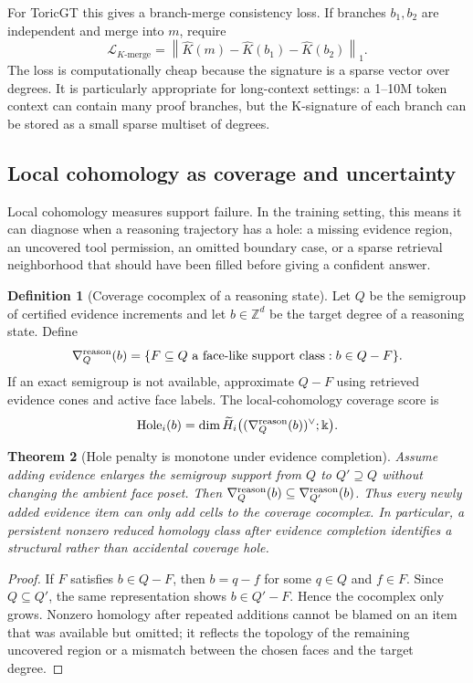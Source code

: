 \documentclass[11pt]{article}
\newtheorem{theorem}{Theorem}[section]
\theoremstyle{definition}
\newtheorem{definition}[theorem]{Definition}
\newcommand{\ZZ}{\mathbb{Z}}
\begin{document}
For ToricGT this gives a branch-merge consistency loss.  If branches \(b_1,b_2\) are independent and merge into \(m\), require
\[
  \mathcal L_{K\text{-merge}}=\left\|\widehat K(m)-\widehat K(b_1)-\widehat K(b_2)\right\|_1.
\]
The loss is computationally cheap because the signature is a sparse vector over degrees.  It is particularly appropriate for long-context settings: a 1--10M token context can contain many proof branches, but the K-signature of each branch can be stored as a small sparse multiset of degrees.

\subsection{Local cohomology as coverage and uncertainty}
Local cohomology measures support failure.  In the training setting, this means it can diagnose when a reasoning trajectory has a hole: a missing evidence region, an uncovered tool permission, an omitted boundary case, or a sparse retrieval neighborhood that should have been filled before giving a confident answer.

\begin{definition}[Coverage cocomplex of a reasoning state]
Let \(Q\) be the semigroup of certified evidence increments and let \(b\in\ZZ^d\) be the target degree of a reasoning state.  Define
\[
 \nabla_Q^{\rm reason}(b)=\{F\subseteq Q\text{ a face-like support class}: b\in Q-F\}.
\]
If an exact semigroup is not available, approximate \(Q-F\) using retrieved evidence cones and active face labels.  The local-cohomology coverage score is
\[
  \mathrm{Hole}_i(b)=\dim \widetilde H_i\big((\nabla_Q^{\rm reason}(b))^\vee;\Bbbk\big).
\]
\end{definition}

\begin{theorem}[Hole penalty is monotone under evidence completion]
Assume adding evidence enlarges the semigroup support from \(Q\) to \(Q'\supseteq Q\) without changing the ambient face poset.  Then \(\nabla_Q^{\rm reason}(b)\subseteq \nabla_{Q'}^{\rm reason}(b)\).  Thus every newly added evidence item can only add cells to the coverage cocomplex.  In particular, a persistent nonzero reduced homology class after evidence completion identifies a structural rather than accidental coverage hole.
\end{theorem}

\begin{proof}
If \(F\) satisfies \(b\in Q-F\), then \(b=q-f\) for some \(q\in Q\) and \(f\in F\).  Since \(Q\subseteq Q'\), the same representation shows \(b\in Q'-F\).  Hence the cocomplex only grows.  Nonzero homology after repeated additions cannot be blamed on an item that was available but omitted; it reflects the topology of the remaining uncovered region or a mismatch between the chosen faces and the target degree.
\end{proof}
\end{document}
